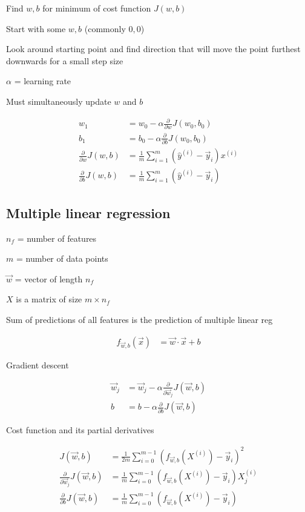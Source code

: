 \documentclass[12pt]{article}
\begin{document}
Find $w,b$ for minimum of cost function $J(w,b)$

\begin{myenumerate}
	\item Start with some $w,b$ (commonly $0,0$)
	\item Look around starting point and find direction that will move the point furthest downwards for a small step size
\end{myenumerate}

$\alpha$ = learning rate

Must simultaneously update $w$ and $b$

\begin{align*}
w_1 &= w_0 - \alpha \frac{\partial}{\partial w} J(w_0,b_0)\\
b_1 &= b_0 - \alpha \frac{\partial}{\partial b} J(w_0,b_0)\\
\frac{\partial}{\partial w} J(w,b) &= \frac{1}{m} \sum_{i=1}^m ({\hat y}^{(i)} - \vec{y}_i) x^{(i)}\\
\frac{\partial}{\partial b} J(w,b) &= \frac{1}{m} \sum_{i=1}^m ({\hat y}^{(i)} - \vec{y}_i)
\end{align*}

\subsection{Multiple linear regression}

$n_f$ = number of features

$m$ = number of data points

$\vec{w}$ = vector of length $n_f$

$X$ is a matrix of size $m \times n_f$

Sum of predictions of all features is the prediction of multiple linear reg

\begin{align*}
f_{\vec{w},b}(\vec{x}) &= \vec{w} \cdot \vec{x} + b
\end{align*}

Gradient descent

\begin{align*}
\vec{w}_j &= \vec{w}_j - \alpha \frac{\partial}{\partial \vec{w}_j} J(\vec{w},b)\\
b &= b - \alpha \frac{\partial}{\partial b} J(\vec{w},b)
\end{align*}

Cost function and its partial derivatives

\begin{align*}
J(\vec{w},b) &= \frac{1}{2m} \sum_{i=0}^{m-1} (f_{\vec{w},b}(X^{(i)}) - \vec{y}_i)^2\\
\frac{\partial}{\partial \vec{w}_j} J(\vec{w},b) &= \frac{1}{m} \sum_{i=0}^{m-1} (f_{\vec{w},b}(X^{(i)}) - \vec{y}_i) X_j^{(i)}\\
\frac{\partial}{\partial b} J(\vec{w},b) &= \frac{1}{m} \sum_{i=0}^{m-1} (f_{\vec{w},b}(X^{(i)}) - \vec{y}_i)
\end{align*}
\end{document}

